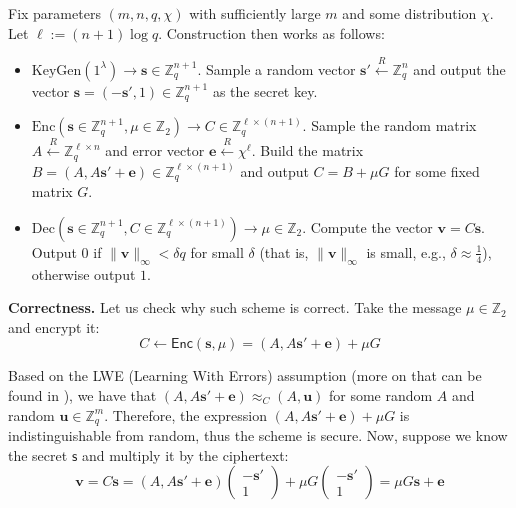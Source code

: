 \documentclass{iacrtrans}
\begin{document}
\begin{definition}
    Fix parameters $(m,n,q,\chi)$ with sufficiently large $m$ and some
    distribution $\chi$. Let $\ell := (n+1)\log q$. Construction then works as
    follows:
    \begin{itemize}
        \item $\mathrm{KeyGen}(1^{\lambda}) \to \mathbf{s} \in
        \mathbb{Z}_q^{n+1}$. Sample a random vector $\mathbf{s}' \xleftarrow{R}
        \mathbb{Z}_q^n$ and output the vector $\mathbf{s} = (-\mathbf{s}',1) \in
        \mathbb{Z}_q^{n+1}$ as the secret key.
        \item $\mathrm{Enc}(\mathbf{s} \in \mathbb{Z}_q^{n+1},\mu \in
        \mathbb{Z}_2) \to C \in \mathbb{Z}_q^{\ell \times (n+1)}$. Sample the 
        random matrix $A \xleftarrow{R} \mathbb{Z}_q^{\ell \times n}$ and 
        error vector $\mathbf{e} \xleftarrow{R} \chi^{\ell}$. Build the 
        matrix $B = (A,A\mathbf{s}'+\mathbf{e}) \in \mathbb{Z}_q^{\ell \times (n+1)}$
        and output $C = B + \mu G$ for some fixed matrix $G$.
        \item $\mathrm{Dec}(\mathbf{s} \in \mathbb{Z}_q^{n+1},C \in
        \mathbb{Z}_q^{\ell \times (n+1)}) \to \mu \in \mathbb{Z}_2$. Compute the
        vector $\mathbf{v} = C\mathbf{s}$. Output $0$ if
        $\|\mathbf{v}\|_{\infty}<\delta q$ for small $\delta$ (that is,
        $\|\mathbf{v}\|_{\infty}$ is small, e.g., $\delta \approx \frac{1}{4}$),
        otherwise output $1$.
    \end{itemize}
\end{definition}

\textbf{Correctness.} Let us check why such scheme is correct. Take the message $\mu \in \mathbb{Z}_2$
and encrypt it:
\begin{equation*}
    C \gets \mathsf{Enc}(\mathbf{s},\mu) = (A,A\mathbf{s}'+\mathbf{e}) + \mu G
\end{equation*}

Based on the LWE (Learning With Errors) assumption (more on that can be found in
\cite{lwe}), we have that $(A,A\mathbf{s}'+\mathbf{e}) \approx_C (A,\mathbf{u})$
for some random $A$ and random $\mathbf{u} \in \mathbb{Z}_q^m$. Therefore, the
expression $(A,A\mathbf{s}'+\mathbf{e}) + \mu G$ is indistinguishable from
random, thus the scheme is secure. Now, suppose we know the secret $\mathsf{s}$
and multiply it by the ciphertext:
\begin{equation*}
    \mathbf{v} = C\mathbf{s} = (A,A\mathbf{s}'+\mathbf{e})\begin{pmatrix}
        -\mathbf{s}' \\ 1
    \end{pmatrix} + \mu G \begin{pmatrix}
        -\mathbf{s}' \\ 1
    \end{pmatrix} = \mu G \mathbf{s} + \mathbf{e}
\end{equation*}
\end{document}
